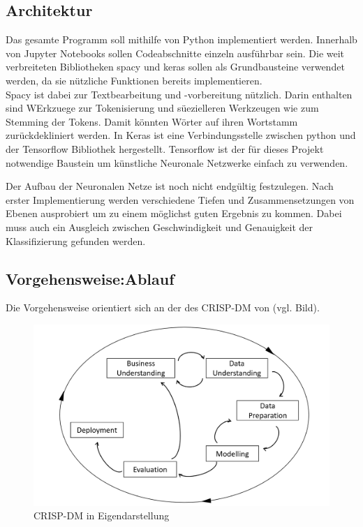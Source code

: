 \documentclass[paper=a4,12pt,listof=totoc]{scrartcl}%
\begin{document}
	\subsection{Architektur} %
	Das gesamte Programm soll mithilfe von Python implementiert werden. Innerhalb von Jupyter Notebooks sollen Codeabschnitte einzeln ausführbar sein. Die weit verbreiteten Bibliotheken spacy und keras sollen als Grundbausteine verwendet werden, da sie nützliche Funktionen bereits implementieren.\\
	Spacy ist dabei zur Textbearbeitung und -vorbereitung nützlich. Darin enthalten sind WErkzuege zur Tokenisierung und süezielleren Werkzeugen wie zum Stemming der Tokens. Damit könnten Wörter auf ihren Wortstamm zurückdekliniert werden.
	In Keras ist eine Verbindungsstelle zwischen python und der Tensorflow Bibliothek hergestellt. Tensorflow ist der für dieses Projekt notwendige Baustein um künstliche Neuronale Netzwerke einfach zu verwenden.
	
	Der Aufbau der Neuronalen Netze ist noch nicht endgültig festzulegen. Nach erster Implementierung werden verschiedene Tiefen und Zusammensetzungen von Ebenen ausprobiert um zu einem möglichst guten Ergebnis zu kommen. Dabei muss auch ein Ausgleich zwischen Geschwindigkeit und Genauigkeit der Klassifizierung gefunden werden.
	
	\subsection{Vorgehensweise:Ablauf} %
	Die Vorgehensweise orientiert sich an der des CRISP-DM von \cite{Cleve.2016} (vgl. Bild). 
	
	\begin{figure}
		\caption{CRISP-DM in Eigendarstellung \cite{Cleve.2016}}
		\centering
		\includegraphics[width=\linewidth]{CRISP-DMGregor.png}
	\end{figure}
	
\end{document}
